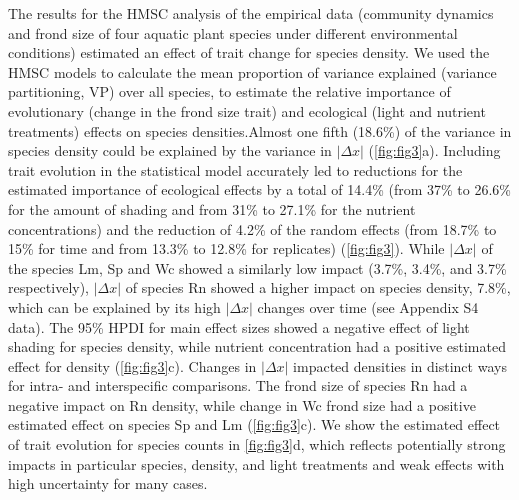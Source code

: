 \documentclass[
]{article}
\begin{document}
The results for the HMSC analysis of the empirical data (community dynamics and frond size of four aquatic plant species under different environmental conditions) estimated an effect of trait change for species density. We used the HMSC models to calculate the mean proportion of variance explained (variance partitioning, VP) over all species, to estimate the relative importance of evolutionary (change in the frond size trait) and ecological (light and nutrient treatments) effects on species densities.Almost one fifth (18.6\%) of the variance in species density could be explained by the variance in \(|\Delta x|\) (\ref{fig:fig3}a). Including trait evolution in the statistical model accurately led to reductions for the estimated importance of ecological effects by a total of 14.4\% (from 37\% to 26.6\% for the amount of shading and from 31\% to 27.1\% for the nutrient concentrations) and the reduction of 4.2\% of the random effects (from 18.7\% to 15\% for time and from 13.3\% to 12.8\% for replicates) (\ref{fig:fig3}). While \(|\Delta x|\) of the species Lm, Sp and Wc showed a similarly low impact (3.7\%, 3.4\%, and 3.7\% respectively), \(|\Delta x|\) of species Rn showed a higher impact on species density, 7.8\%, which can be explained by its high \(|\Delta x|\) changes over time (see Appendix S4 data). The 95\% HPDI for main effect sizes showed a negative effect of light shading for species density, while nutrient concentration had a positive estimated effect for density (\ref{fig:fig3}c). Changes in \(|\Delta x|\) impacted densities in distinct ways for intra- and interspecific comparisons. The frond size of species Rn had a negative impact on Rn density, while change in Wc frond size had a positive estimated effect on species Sp and Lm (\ref{fig:fig3}c). We show the estimated effect of trait evolution for species counts in \ref{fig:fig3}d, which reflects potentially strong impacts in particular species, density, and light treatments and weak effects with high uncertainty for many cases.
\end{document}
